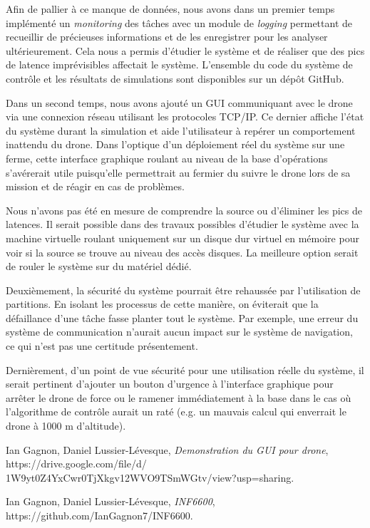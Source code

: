 \documentclass[journal]{IEEEtran}
\begin{document}
Afin de pallier à ce manque de données, nous avons dans un premier temps implémenté un \textit{monitoring} des tâches avec un module de \textit{logging} permettant de recueillir de précieuses informations et de les enregistrer pour les analyser ultérieurement. Cela nous a permis d'étudier le système et de réaliser que des pics de latence imprévisibles affectait le système.
L'ensemble du code du système de contrôle et les résultats de simulations sont disponibles sur un dépôt GitHub\cite{ref:code}.

Dans un second temps, nous avons ajouté un GUI communiquant avec le drone via une connexion réseau utilisant les protocoles TCP/IP. Ce dernier affiche l'état du système durant la simulation et aide l'utilisateur à repérer un comportement inattendu du drone. Dans l'optique d'un déploiement réel du système sur une ferme, cette interface graphique roulant au niveau de la base d'opérations s'avérerait utile puisqu'elle permettrait au fermier du suivre le drone lors de sa mission et de réagir en cas de problèmes.

Nous n'avons pas été en mesure de comprendre la source ou d'éliminer les pics de latences. Il serait possible dans des travaux possibles d'étudier le système avec la machine virtuelle roulant uniquement sur un disque dur virtuel en mémoire pour voir si la source se trouve au niveau des accès disques. La meilleure option serait de rouler le système sur du matériel dédié.

Deuxièmement, la sécurité du système pourrait être rehaussée par l'utilisation de partitions. En isolant les processus de cette manière, on éviterait que la défaillance d'une tâche fasse planter tout le système. Par exemple, une erreur du système de communication n'aurait aucun impact sur le système de navigation, ce qui n'est pas une certitude présentement.

Dernièrement, d'un point de vue sécurité pour une utilisation réelle du système, il serait pertinent d'ajouter un bouton d'urgence à l'interface graphique pour arrêter le drone de force ou le ramener immédiatement à la base dans le cas où l'algorithme de contrôle aurait un raté (e.g. un mauvais calcul qui enverrait le drone à 1000 m d'altitude). 


\begin{thebibliography}{1}

Ian Gagnon, Daniel Lussier-Lévesque, \emph{Demonstration du GUI pour drone},\newline
https://drive.google.com/file/d/\newline
1W9yt0Z4YxCwr0TjXkgv12WVO9TSmWGtv/view?usp=sharing.

Ian Gagnon, Daniel Lussier-Lévesque, \emph{INF6600},\newline
https://github.com/IanGagnon7/INF6600.


\end{thebibliography}







\end{document}
